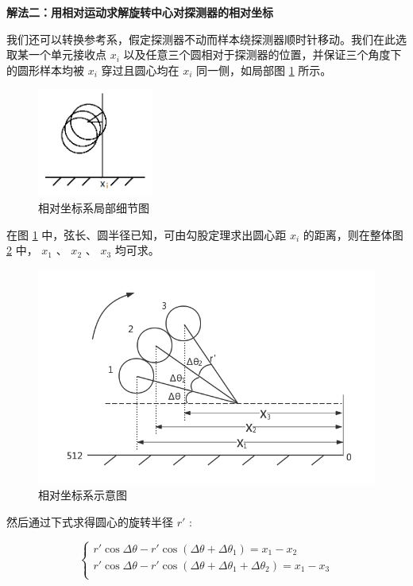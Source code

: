 \documentclass[UTF8]{ctexart}
\begin{document}
\textbf{解法二：用相对运动求解旋转中心对探测器的相对坐标}

我们还可以转换参考系，假定探测器不动而样本绕探测器顺时针移动。我们在此选取某一个单元接收点 $x_i$ 以及任意三个圆相对于探测器的位置，并保证三个角度下的圆形样本均被 $x_i$ 穿过且圆心均在 $x_i$ 同一侧，如局部图 \ref{fig:detail} 所示。

\begin{figure}[htbp]
  \centering
  \includegraphics[width=1.5in]{../figure/detail.png}
  \caption{相对坐标系局部细节图}
  \label{fig:detail}
\end{figure}

在图 \ref{fig:detail} 中，弦长、圆半径已知，可由勾股定理求出圆心距 $x_i$ 的距离，则在整体图 \ref{fig:roar} 中， $x_1$ 、 $x_2$ 、 $x_3$ 均可求。 

\begin{figure}[htbp]
  \centering
  \includegraphics[width=4.5in]{../figure/roar.png}
  \caption{相对坐标系示意图}
  \label{fig:roar}
\end{figure}

然后通过下式求得圆心的旋转半径 $r'$ :

$$
\begin{cases}
  r'\cos\Delta\theta-r'\cos(\Delta\theta+\Delta\theta_1)=x_1-x_2 \\
  r'\cos\Delta\theta-r'\cos(\Delta\theta+\Delta\theta_1+\Delta\theta_2)=x_1-x_3 \\
\end{cases}
$$
\end{document}
